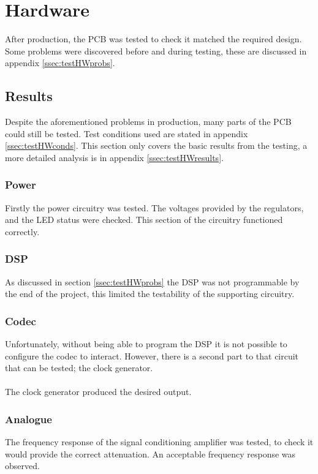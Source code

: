 \section{Hardware}

After production, the PCB was tested to check it matched the required design.
Some problems were discovered before and during testing, these are discussed in appendix \ref{ssec:testHWprobs}.

\subsection{Results}
Despite the aforementioned problems in production, many parts of the PCB could still be tested.
Test conditions used are stated in appendix \ref{ssec:testHWconds}.
This section only covers the basic results from the testing, a more detailed analysis is in appendix \ref{ssec:testHWresults}.

\subsubsection{Power}
Firstly the power circuitry was tested.
The voltages provided by the regulators, and the LED status were checked.
This section of the circuitry functioned correctly.

\subsubsection{DSP}
As discussed in section \ref{ssec:testHWprobs} the DSP was not programmable by the end of the project, this limited the testability of the supporting circuitry.
\subsubsection{Codec}
Unfortunately, without being able to program the DSP it is not possible to configure the codec to interact.
However, there is a second part to that circuit that can be tested; the clock generator.
\\
\\
The clock generator produced the desired output. 

\subsubsection{Analogue}
The frequency response of the signal conditioning amplifier was tested, to check it would provide the correct attenuation.
An acceptable frequency response was observed.
